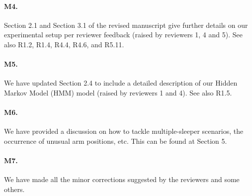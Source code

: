 \paragraph{M4.} Section 2.1 and Section 3.1 of the revised manuscript give further details on our experimental setup per reviewer feedback (raised by reviewers 1, 4 and 5). See also R1.2, R1.4, R4.4, R4.6, and R5.11.

\paragraph{M5.} We have updated Section 2.4 to include a detailed description of our Hidden Markov Model (HMM) model (raised by reviewers 1 and 4). See also R1.5.


\paragraph{M6.} We have provided a discussion on how to tackle multiple-sleeper scenarios, the occurrence of unusual arm positions, etc. This can be
found at Section 5.

\paragraph{M7.} We have made all the minor corrections suggested by the reviewers and some others.
